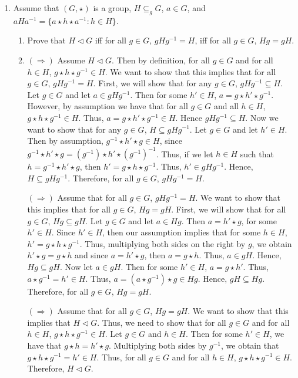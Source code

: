 \documentclass[12pt]{article}
\makeatletter
\theoremstyle{definition}
\theoremstyle{remark}
\renewenvironment{proof}[1][\proofname]{\par
  \pushQED{\qed}%
  \normalfont \topsep6\p@\@plus6\p@\relax
  \list{}{\leftmargin=0mm
          \rightmargin=4mm
          \settowidth{\itemindent}{\itshape#1}%
          \labelwidth=\itemindent
          \parsep=0pt \listparindent=\parindent 
  }
  \item[\hskip\labelsep
        \itshape
    #1\@addpunct{.}]\ignorespaces
}{%
  \popQED\endlist\@endpefalse
}
\let\oldproofname=\proofname
\renewcommand{\proofname}{\bf{\textit{\oldproofname}}}
\makeatother
\begin{document}
\begin{enumerate}[leftmargin=*]
    \item Assume that $(G,\star)$ is a group, $H\subseteq_g G$, $a\in G$, and $aHa^{-1}=\{a\star h\star a^{-1}\colon h\in H\}$.
        \begin{enumerate}[label=(\alph*)]
            \item Prove that $H\triangleleft G$ iff for all $g\in G$, $gHg^{-1}=H$, iff for all $g\in G$, $Hg=gH$.
                \begin{proof}
                    $(\Rightarrow)$ Assume $H\triangleleft G$. Then by definition, for all $g\in G$ and for all $h\in H$, $g\star h\star g^{-1}\in H$. We want to show that this implies that for all $g\in G$, $gHg^{-1}=H$. First, we will show that for any $g\in G$, $gHg^{-1}\subseteq H$. Let $g\in G$ and let $a\in gHg^{-1}$. Then for some $h'\in H$, $a=g\star h'\star g^{-1}$. However, by assumption we have that for all $g\in G$ and all $h\in H$, $g\star h\star g^{-1}\in H$. Thus, $a=g\star h'\star g^{-1}\in H$. Hence $gHg^{-1}\subseteq H$. Now we want to show that for any $g\in G$, $H\subseteq gHg^{-1}$. Let $g\in G$ and let $h'\in H$. Then by assumption, $g^{-1}\star h'\star g\in H$, since $g^{-1}\star h'\star g=(g^{-1})\star h'\star (g^{-1})^{-1}$. Thus, if we let $h\in H$ such that $h=g^{-1}\star h'\star g$, then $h'=g\star h\star g^{-1}$. Thus, $h'\in gHg^{-1}$. Hence, $H\subseteq gHg^{-1}$. Therefore, for all $g\in G$, $gHg^{-1}=H$.\par\hspace{4mm}
                    $(\Rightarrow)$ Assume that for all $g\in G$, $gHg^{-1}=H$. We want to show that this implies that for all $g\in G$, $Hg=gH$. First, we will show that for all $g\in G$, $Hg\subseteq gH$. Let $g\in G$ and let $a\in Hg$. Then $a=h'\star g$, for some $h'\in H$. Since $h'\in H$, then our assumption implies that for some $h\in H$, $h'=g\star h\star g^{-1}$. Thus, multiplying both sides on the right by $g$, we obtain $h'\star g=g\star h$ and since $a=h'\star g$, then $a=g\star h$. Thus, $a\in gH$. Hence, $Hg\subseteq gH$. Now let $a\in gH$. Then for some $h'\in H$, $a=g\star h'$. Thus, $a\star g^{-1}=h'\in H$. Thus, $a=(a\star g^{-1})\star g\in Hg$. Hence, $gH\subseteq Hg$. Therefore, for all $g\in G$, $Hg=gH$.\par\hspace{4mm} $(\Rightarrow)$ Assume that for all $g\in G$, $Hg=gH$. We want to show that this implies that $H\triangleleft G$. Thus, we need to show that for all $g\in G$ and for all $h\in H$, $g\star h\star g^{-1}\in H$. Let $g\in G$ and $h\in H$. Then for some $h'\in H$, we have that $g\star h=h'\star g$. Multiplying both sides by $g^{-1}$, we obtain that $g\star h\star g^{-1}=h'\in H$. Thus, for all $g\in G$ and for all $h\in H$, $g\star h\star g^{-1}\in H$. Therefore, $H\triangleleft G$.

\end{proof}
\end{enumerate}
\end{enumerate}
\end{document}
